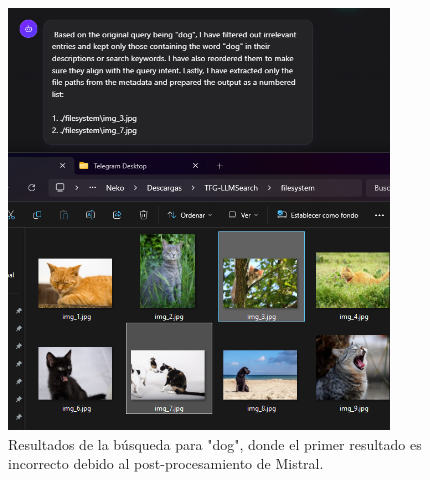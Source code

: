 \begin{figure}[H]
\centering
\includegraphics[width=0.9\textwidth]{archivos/dogs_result.png}
\caption[Resultados de búsqueda para "dog" con error]{Resultados de la búsqueda para "dog", donde el primer resultado es incorrecto debido al post-procesamiento de Mistral.}
\label{fig:dogs_search_results_error}
\end{figure}


